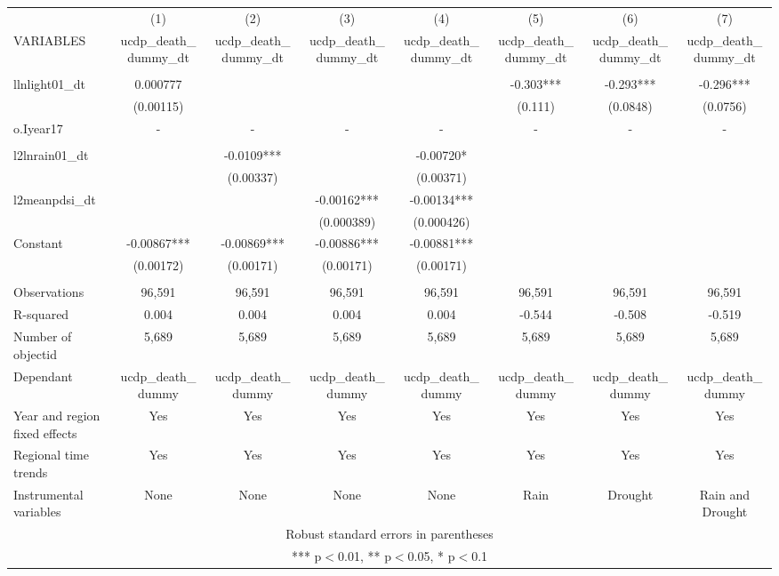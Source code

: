 \documentclass[]{article}
\begin{document}
\begin{tabular}{lccccccc} \hline
 & (1) & (2) & (3) & (4) & (5) & (6) & (7) \\
VARIABLES & ucdp\_death\_dummy\_dt & ucdp\_death\_dummy\_dt & ucdp\_death\_dummy\_dt & ucdp\_death\_dummy\_dt & ucdp\_death\_dummy\_dt & ucdp\_death\_dummy\_dt & ucdp\_death\_dummy\_dt \\ \hline
 &  &  &  &  &  &  &  \\
llnlight01\_dt & 0.000777 &  &  &  & -0.303*** & -0.293*** & -0.296*** \\
 & (0.00115) &  &  &  & (0.111) & (0.0848) & (0.0756) \\
o.Iyear17 & - & - & - & - & - & - & - \\
 &  &  &  &  &  &  &  \\
l2lnrain01\_dt &  & -0.0109*** &  & -0.00720* &  &  &  \\
 &  & (0.00337) &  & (0.00371) &  &  &  \\
l2meanpdsi\_dt &  &  & -0.00162*** & -0.00134*** &  &  &  \\
 &  &  & (0.000389) & (0.000426) &  &  &  \\
Constant & -0.00867*** & -0.00869*** & -0.00886*** & -0.00881*** &  &  &  \\
 & (0.00172) & (0.00171) & (0.00171) & (0.00171) &  &  &  \\
 &  &  &  &  &  &  &  \\
Observations & 96,591 & 96,591 & 96,591 & 96,591 & 96,591 & 96,591 & 96,591 \\
R-squared & 0.004 & 0.004 & 0.004 & 0.004 & -0.544 & -0.508 & -0.519 \\
Number of objectid & 5,689 & 5,689 & 5,689 & 5,689 & 5,689 & 5,689 & 5,689 \\
Dependant & ucdp\_death\_dummy & ucdp\_death\_dummy & ucdp\_death\_dummy & ucdp\_death\_dummy & ucdp\_death\_dummy & ucdp\_death\_dummy & ucdp\_death\_dummy \\
Year and region fixed effects & Yes & Yes & Yes & Yes & Yes & Yes & Yes \\
Regional time trends & Yes & Yes & Yes & Yes & Yes & Yes & Yes \\
 Instrumental variables & None & None & None & None & Rain & Drought & Rain and Drought \\ \hline
\multicolumn{8}{c}{ Robust standard errors in parentheses} \\
\multicolumn{8}{c}{ *** p$<$0.01, ** p$<$0.05, * p$<$0.1} \\
\end{tabular}
\end{document}
